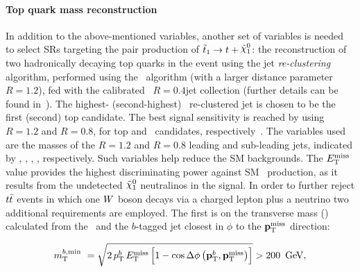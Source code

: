 			\paragraph*{Top quark mass reconstruction}

				In addition to the above-mentioned variables, another set of variables is needed to select \acp{SR} targeting the pair production of $\stopone \to t + \ninoone$: the reconstruction of two hadronically decaying top quarks in the event using the jet \emph{re-clustering} algorithm, performed using the \antikt\ algorithm (with a larger distance parameter $R = 1.2$), fed with the calibrated \antikt\ $R = 0.4 $jet collection (further details can be found in~\cite{Antikt2008}). The highest- (second-highest) \pt\ re-clustered jet is chosen to be the first (second) top candidate. The best signal sensitivity is reached by using $R = 1.2$ and $R = 0.8$, for top and \Wboson\ candidates, respectively~\cite{stop0L,ICHEPstop0L}. The variables used are the masses of the $R=1.2$ and $R=0.8$ leading and sub-leading jets, indicated by \mantikttwelvezero, \mantikttwelveone, \mantikteightzero, \mantikteightone, respectively. Such variables help reduce the \ac{SM} backgrounds. %
				The $E_{\mathrm{T}}^{\mathrm{miss}}$ value provides the highest discriminating power against \ac{SM} \ttbar\ production, as it results from the undetected $\ninoone$ neutralinos in the signal. In order to further reject $t\bar{t}$ events in which one $W$ boson decays via a charged lepton plus a neutrino two additional requirements are employed. The first is on the transverse mass (\mt) calculated from the \met\ and the $b$-tagged jet closest in $\phi$ to the $\mathbf{p}_\mathrm{T}^\mathrm{miss}$ direction: 

				\begin{equation*}
					\mtbmin\ = \sqrt{2\,\ptb\,\met \left[1-\cos{\Delta\phi\left(\vecptb,\ptmiss\right)}\right]} > 200\,\GeV,
				\end{equation*}

